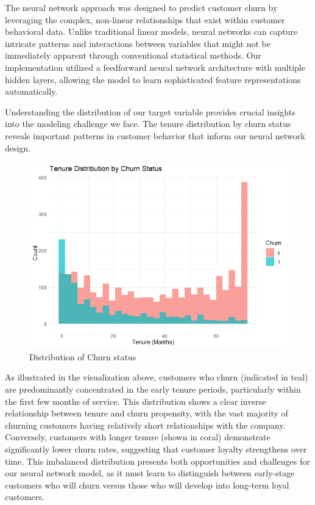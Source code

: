 \documentclass[
]{article}
\begin{document}
The neural network approach was designed to predict customer churn by
leveraging the complex, non-linear relationships that exist within
customer behavioral data. Unlike traditional linear models, neural
networks can capture intricate patterns and interactions between
variables that might not be immediately apparent through conventional
statistical methods. Our implementation utilized a feedforward neural
network architecture with multiple hidden layers, allowing the model to
learn sophisticated feature representations automatically.

Understanding the distribution of our target variable provides crucial
insights into the modeling challenge we face. The tenure distribution by
churn status reveals important patterns in customer behavior that inform
our neural network design.

\begin{figure}

{\centering \includegraphics[width=0.85\linewidth]{Plots/distributionchurnstatus} 

}

\caption{Distribution of Churn status}\label{fig:distribution-status-plot}
\end{figure}

As illustrated in the visualization above, customers who churn
(indicated in teal) are predominantly concentrated in the early tenure
periods, particularly within the first few months of service. This
distribution shows a clear inverse relationship between tenure and churn
propensity, with the vast majority of churning customers having
relatively short relationships with the company. Conversely, customers
with longer tenure (shown in coral) demonstrate significantly lower
churn rates, suggesting that customer loyalty strengthens over time.
This imbalanced distribution presents both opportunities and challenges
for our neural network model, as it must learn to distinguish between
early-stage customers who will churn versus those who will develop into
long-term loyal customers.
\end{document}
